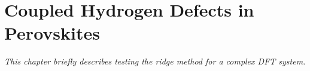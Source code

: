 \chapter{Coupled Hydrogen Defects in Perovskites}
\label{chap:perovskites}

\textit{This chapter briefly describes testing the ridge method for a complex DFT system.}





